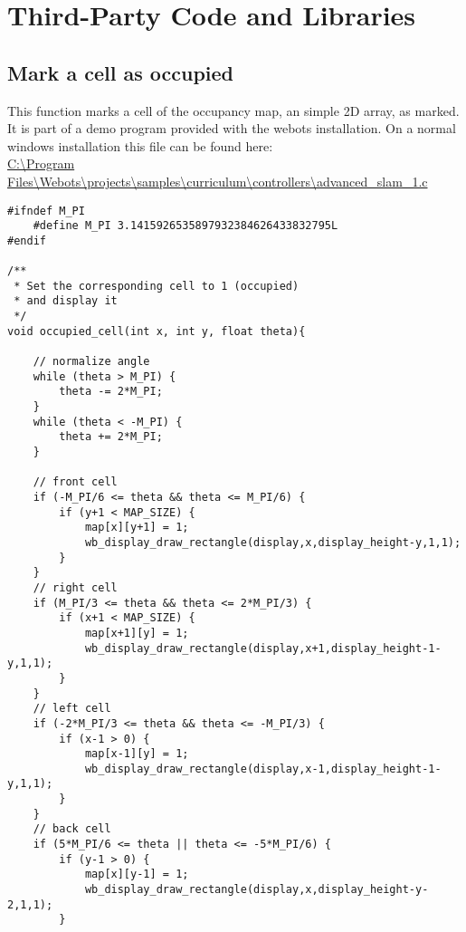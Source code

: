 \chapter{Third-Party Code and Libraries}

\section{Mark a cell as occupied}
\label{occupied_cell}
This function marks a cell of the occupancy map, an simple 2D array, as marked. 
It is part of a demo program provided with the webots installation.
On a normal windows installation this file can be found here:\\
\url{C:\Program Files\Webots\projects\samples\curriculum\controllers\advanced\_slam\_1.c}

\begin{lstlisting}[caption={Mark an cell as occupied}]
#ifndef M_PI
	#define M_PI 3.1415926535897932384626433832795L
#endif

/**
 * Set the corresponding cell to 1 (occupied)
 * and display it
 */
void occupied_cell(int x, int y, float theta){

	// normalize angle
	while (theta > M_PI) {
		theta -= 2*M_PI;
	}
	while (theta < -M_PI) {
		theta += 2*M_PI;
	}

	// front cell
	if (-M_PI/6 <= theta && theta <= M_PI/6) {
		if (y+1 < MAP_SIZE) {
			map[x][y+1] = 1;
			wb_display_draw_rectangle(display,x,display_height-y,1,1);
		}
	}
	// right cell
	if (M_PI/3 <= theta && theta <= 2*M_PI/3) {
		if (x+1 < MAP_SIZE) {
			map[x+1][y] = 1;
			wb_display_draw_rectangle(display,x+1,display_height-1-y,1,1);
		}
	}
	// left cell
	if (-2*M_PI/3 <= theta && theta <= -M_PI/3) {
		if (x-1 > 0) {
			map[x-1][y] = 1;
			wb_display_draw_rectangle(display,x-1,display_height-1-y,1,1);
		}
	}
	// back cell
	if (5*M_PI/6 <= theta || theta <= -5*M_PI/6) {
		if (y-1 > 0) {
			map[x][y-1] = 1;
			wb_display_draw_rectangle(display,x,display_height-y-2,1,1);
		}
	
\end{lstlisting}
